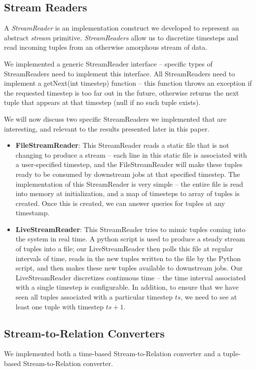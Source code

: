 \documentclass[a4paper, 10pt, conference]{IEEEconf}
\begin{document}
\subsection{Stream Readers}
A \textit{StreamReader} is an implementation construct we developed to represent an abstract \textit{stream} primitive. \textit{StreamReaders} allow us to discretize timesteps and read incoming tuples from an otherwise amorphous stream of data.

We implemented a generic StreamReader interface -- specific types of StreamReaders need to implement this interface. All StreamReaders need to implement a getNext(int timestep) function -- this function throws an exception if the requested timestep is too far out in the future, otherwise returns the next tuple that appears at that timestep (null if no such tuple exists).

We will now discuss two specific StreamReaders we implemented that are interesting, and relevant to the results presented later in this paper.

\begin{itemize}
\item \textbf{FileStreamReader}: This StreamReader reads a static file that is not changing to produce a stream -- each line in this static file is associated with a user-specified timestep, and the FileStreamReader will make these tuples ready to be consumed by downstream jobs at that specified timestep.
The implementation of this StreamReader is very simple -- the entire file is read into memory at initialization, and a map of timesteps to array of tuples is created. Once this is created, we can answer queries for tuples at any timestamp.

\item \textbf{LiveStreamReader}: This StreamReader tries to mimic tuples coming into the system in real time. A python script is used to produce a steady stream of tuples into a file; our LiveStreamReader then polls this file at regular intervals of time, reads in the new tuples written to the file by the Python script, and then makes these new tuples available to downstream jobs.
Our LiveStreamReader discretizes continuous time -- the time interval associated with a single timestep is configurable. In addition, to ensure that we have seen all tuples associated with a particular timestep $ts$, we need to see at least one tuple with timestep $ts + 1$.
\end{itemize}


\subsection{Stream-to-Relation Converters}
We implemented both a time-based Stream-to-Relation converter and a tuple-based Stream-to-Relation converter. 
\end{document}
